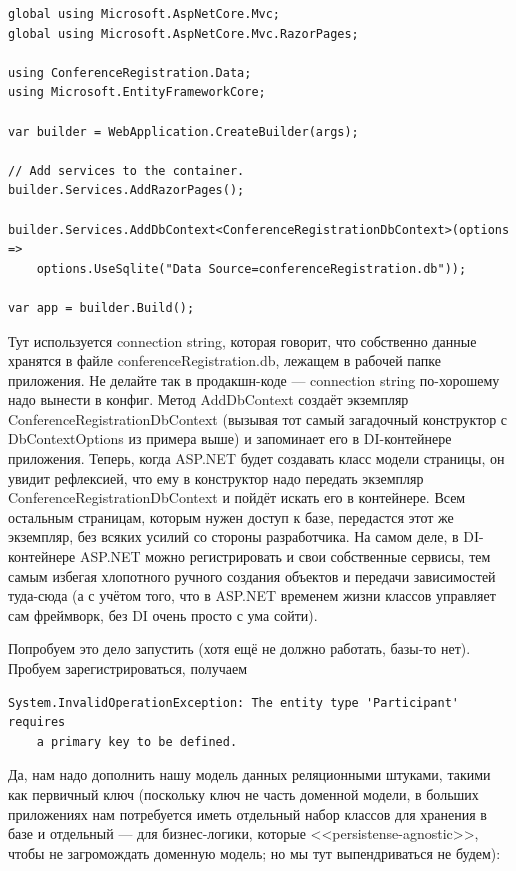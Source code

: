 \documentclass[a5paper]{article}
\begin{document}
\begin{verbatim}
global using Microsoft.AspNetCore.Mvc;
global using Microsoft.AspNetCore.Mvc.RazorPages;

using ConferenceRegistration.Data;
using Microsoft.EntityFrameworkCore;

var builder = WebApplication.CreateBuilder(args);

// Add services to the container.
builder.Services.AddRazorPages();

builder.Services.AddDbContext<ConferenceRegistrationDbContext>(options =>
    options.UseSqlite("Data Source=conferenceRegistration.db"));

var app = builder.Build();
\end{verbatim}

Тут используется connection string, которая говорит, что собственно данные хранятся в файле conferenceRegistration.db, лежащем в рабочей папке приложения. Не делайте так в продакшн-коде --- connection string по-хорошему надо вынести в конфиг. Метод AddDbContext создаёт экземпляр ConferenceRegistrationDbContext (вызывая тот самый загадочный конструктор с DbContextOptions из примера выше) и запоминает его в DI-контейнере приложения. Теперь, когда ASP.NET будет создавать класс модели страницы, он увидит рефлексией, что ему в конструктор надо передать экземпляр ConferenceRegistrationDbContext и пойдёт искать его в контейнере. Всем остальным страницам, которым нужен доступ к базе, передастся этот же экземпляр, без всяких усилий со стороны разработчика. На самом деле, в DI-контейнере ASP.NET можно регистрировать и свои собственные сервисы, тем самым избегая хлопотного ручного создания объектов и передачи зависимостей туда-сюда (а с учётом того, что в ASP.NET временем жизни классов управляет сам фреймворк, без DI очень просто с ума сойти).

Попробуем это дело запустить (хотя ещё не должно работать, базы-то нет). Пробуем зарегистрироваться, получаем 

\begin{verbatim}
System.InvalidOperationException: The entity type 'Participant' requires 
    a primary key to be defined.
\end{verbatim}

Да, нам надо дополнить нашу модель данных реляционными штуками, такими как первичный ключ (поскольку ключ не часть доменной модели, в больших приложениях нам потребуется иметь отдельный набор классов для хранения в базе и отдельный --- для бизнес-логики, которые <<persistense-agnostic>>, чтобы не загромождать доменную модель; но мы тут выпендриваться не будем):
\end{document}
